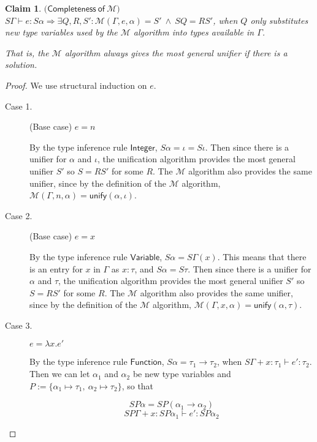 \documentclass{article}
\newtheorem{clm}{Claim}[section]
\begin{document}
\begin{clm}$\mathsf{(Completeness \: of\:} \mathcal{M}\mathsf{)}$
$S\Gamma \vdash e : S\alpha \Rightarrow \exists Q, R, S' : \mathcal{M}(\Gamma, e, \alpha) = S' \:\wedge\: SQ = RS'$, when $Q$ only substitutes new type variables used by the $\mathcal{M}$ algorithm into types available in $\Gamma$.

That is, the $\mathcal{M}$ algorithm always gives the most general unifier if there is a solution.
\end{clm}
\begin{proof}
We use structural induction on $e$.

\begin{description}
\item[Case 1.] (Base case) $e = n$

By the type inference rule $\mathsf{Integer}$, $S\alpha = \iota = S\iota$. Then since there is a unifier for $\alpha$ and $\iota$, the unification algorithm provides the most general unifier $S'$ so $S=RS'$ for some $R$. The $\mathcal{M}$ algorithm also provides the same unifier, since by the definition of the $\mathcal{M}$ algorithm, $\mathcal{M}(\Gamma, n, \alpha) = \mathsf{unify}(\alpha, \iota)$.

\item[Case 2.] (Base case) $e = x$

By the type inference rule $\mathsf{Variable}$, $S\alpha = S\Gamma(x)$. This means that there is an entry for $x$ in $\Gamma$ as $x : \tau$, and $S\alpha = S\tau$. Then since there is a unifier for $\alpha$ and $\tau$, the unification algorithm provides the most general unifier $S'$ so $S=RS'$ for some $R$. The $\mathcal{M}$ algorithm also provides the same unifier, since by the definition of the $\mathcal{M}$ algorithm, $\mathcal{M}(\Gamma, x, \alpha) = \mathsf{unify}(\alpha, \tau)$.

\item[Case 3.] $e = \lambda x.e'$

By the type inference rule $\mathsf{Function}$, $S\alpha = \tau_1 \rightarrow \tau_2$, when $S\Gamma + x : \tau_1 \vdash e' : \tau_2$. Then we can let $\alpha_1$ and $\alpha_2$ be new type variables and $P := \{\alpha_1\mapsto\tau_1,\:\alpha_2\mapsto\tau_2\}$, so that 

\begin{equation}
SP\alpha = SP(\alpha_1\rightarrow\alpha_2)
\end{equation}
\begin{equation}
SP\Gamma + x : SP\alpha_1 \vdash e' : SP\alpha_2
\end{equation}


\end{description}
\end{proof}
\end{document}
